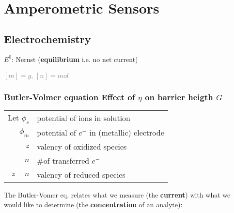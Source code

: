 
\section{Amperometric Sensors}
\subsection{Electrochemistry}
%
{\hfill\scriptsize $E^0$: Nernst}%
\quad (\textbf{equilibrium} i.e. no net current)

\enskip \textcolor{gray}{\scriptsize $[m] {=} \unit{g}$, $[n] {=} \unit{mol}$}
\subsubsection{Butler-Volmer equation \textnormal{Effect of $\eta$ on barrier heigth $G$}}
\label{sec:butler-volmer}
%
\begin{tabular}{r@{:\quad}l}
    Let
    $\phi_s$	& potential of ions in solution\\
    $\phi_m$	& potential of $e^-$ in (metallic) electrode\\
    $z$			& valency of oxidized species\\
    $n$			& \#of transferred $e^-$\\
    $z-n$		& valency of reduced species
\end{tabular}

The Butler-Vomer eq. relates what we measure (the \textbf{current}) with what we would like to determine (the \textbf{concentration} of an analyte):
